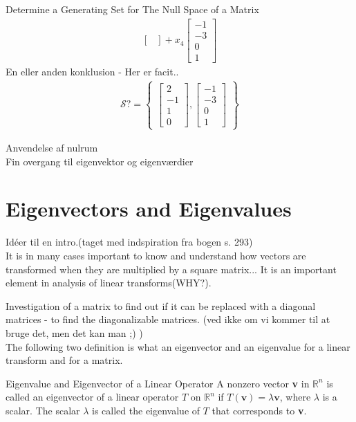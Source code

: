 \begin{example}{Determine a Generating Set for The Null Space of a Matrix }
\begin{align*}
\begin{bmatrix}
\end{bmatrix} + x_4
\begin{bmatrix}
   -1\\ -3\\ 0\\ 1
\end{bmatrix}
\end{align*}
En eller anden konklusion - Her er facit..
\begin{align*}
\mathcal{S?} = 
\begin{Bmatrix}
\begin{bmatrix}
   2\\ -1\\ 1 \\0
\end{bmatrix},
\begin{bmatrix}
   -1\\ -3\\ 0\\ 1
\end{bmatrix}
\end{Bmatrix}
\end{align*}
\end{example}

Anvendelse af nulrum\\
Fin overgang til eigenvektor og eigenværdier

\section{Eigenvectors and Eigenvalues}
Idéer til en intro.(taget med indspiration fra bogen s. 293)\\
It is in many cases important to know and understand how vectors are transformed when they are multiplied by a square matrix... 
It is an important element in analysis of linear transforms(WHY?).

Investigation of a matrix to find out if it can be replaced with a diagonal matrices - to find the diagonalizable matrices. (ved ikke om vi kommer til at bruge det, men det kan man ;) )
\\
The following two definition is what an eigenvector and an eigenvalue for a linear transform and for a matrix.
\begin{definition}{Eigenvalue and Eigenvector of a Linear Operator}
A nonzero vector \textbf{v} in $\mathbb{R}^n$ is called an eigenvector of a linear operator $T$ on $\mathbb{R}^n$ if $T(\textbf{v})=\lambda\textbf{v}$, where $\lambda$ is a scalar. The scalar $\lambda$ is called the eigenvalue of $T$ that corresponds to \textbf{v}. 
\end{definition}

